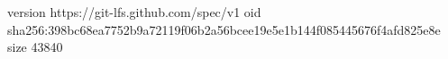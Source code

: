 version https://git-lfs.github.com/spec/v1
oid sha256:398bc68ea7752b9a72119f06b2a56bcee19e5e1b144f085445676f4afd825e8e
size 43840
